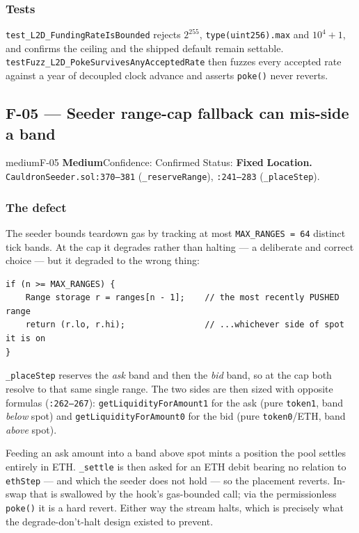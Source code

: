 \documentclass[11pt,a4paper]{article}
\newcommand{\code}[1]{\texttt{\small #1}}
\newcommand{\fileref}[1]{\texttt{\scriptsize #1}}
\begin{document}
\subsubsection*{Tests}

\code{test\_L2D\_FundingRateIsBounded} rejects $2^{255}$,
\code{type(uint256).max} and $10^4+1$, and confirms the ceiling and the shipped
default remain settable. \code{testFuzz\_L2D\_PokeSurvivesAnyAcceptedRate} then
fuzzes every accepted rate against a year of decoupled clock advance and asserts
\code{poke()} never reverts.

\newpage
\subsection{F-05 --- Seeder range-cap fallback can mis-side a band}

\begin{findingbox}{medium}{F-05 \quad \textbf{Medium}\quad Confidence: Confirmed \quad Status: \textbf{Fixed}}
\textbf{Location.} \fileref{CauldronSeeder.sol:370--381} (\code{\_reserveRange}),
\fileref{:241--283} (\code{\_placeStep}).
\end{findingbox}

\subsubsection*{The defect}

The seeder bounds teardown gas by tracking at most \code{MAX\_RANGES = 64} distinct
tick bands. At the cap it degrades rather than halting --- a deliberate and correct
choice --- but it degraded to the wrong thing:

\begin{lstlisting}
if (n >= MAX_RANGES) {
    Range storage r = ranges[n - 1];    // the most recently PUSHED range
    return (r.lo, r.hi);                // ...whichever side of spot it is on
}
\end{lstlisting}

\code{\_placeStep} reserves the \emph{ask} band and then the \emph{bid} band, so at
the cap both resolve to that same single range. The two sides are then sized with
opposite formulas (\fileref{:262--267}): \code{getLiquidityForAmount1} for the ask
(pure \code{token1}, band \emph{below} spot) and \code{getLiquidityForAmount0} for
the bid (pure \code{token0}/ETH, band \emph{above} spot).

Feeding an ask amount into a band above spot mints a position the pool settles
entirely in ETH. \code{\_settle} is then asked for an ETH debit bearing no relation
to \code{ethStep} --- and which the seeder does not hold --- so the placement
reverts. In-swap that is swallowed by the hook's gas-bounded call; via the
permissionless \code{poke()} it is a hard revert. Either way the stream halts,
which is precisely what the degrade-don't-halt design existed to prevent.
\end{document}
